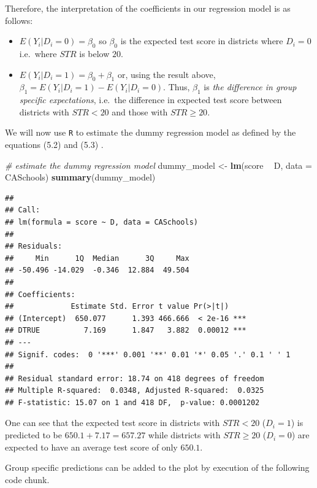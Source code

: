 \documentclass[]{book}
\newenvironment{Shaded}{\begin{snugshade}}{\end{snugshade}}
\newcommand{\KeywordTok}[1]{\textcolor[rgb]{0.13,0.29,0.53}{\textbf{#1}}}
\newcommand{\DataTypeTok}[1]{\textcolor[rgb]{0.13,0.29,0.53}{#1}}
\newcommand{\StringTok}[1]{\textcolor[rgb]{0.31,0.60,0.02}{#1}}
\newcommand{\CommentTok}[1]{\textcolor[rgb]{0.56,0.35,0.01}{\textit{#1}}}
\newcommand{\OperatorTok}[1]{\textcolor[rgb]{0.81,0.36,0.00}{\textbf{#1}}}
\newcommand{\NormalTok}[1]{#1}
\theoremstyle{definition}
\theoremstyle{definition}
\theoremstyle{definition}
\theoremstyle{remark}
\begin{document}
Therefore, the interpretation of the coefficients in our regression
model is as follows:

\begin{itemize}
\item
  \(E(Y_i | D_i = 0) = \beta_0\) so \(\beta_0\) is the expected test
  score in districts where \(D_i=0\) i.e.~where \(STR\) is below \(20\).
\item
  \(E(Y_i | D_i = 1) = \beta_0 + \beta_1\) or, using the result above,
  \(\beta_1 = E(Y_i | D_i = 1) - E(Y_i | D_i = 0)\). Thus, \(\beta_1\)
  is \emph{the difference in group specific expectations}, i.e.~the
  difference in expected test score between districts with \(STR < 20\)
  and those with \(STR \geq 20\).
\end{itemize}

We will now use \texttt{R} to estimate the dummy regression model as
defined by the equations (5.2) and (5.3) .

\begin{Shaded}
\begin{Highlighting}[]
\CommentTok{# estimate the dummy regression model}
\NormalTok{dummy_model <-}\StringTok{ }\KeywordTok{lm}\NormalTok{(score }\OperatorTok{~}\StringTok{ }\NormalTok{D, }\DataTypeTok{data =}\NormalTok{ CASchools)}
\KeywordTok{summary}\NormalTok{(dummy_model)}
\end{Highlighting}
\end{Shaded}

\begin{verbatim}
## 
## Call:
## lm(formula = score ~ D, data = CASchools)
## 
## Residuals:
##     Min      1Q  Median      3Q     Max 
## -50.496 -14.029  -0.346  12.884  49.504 
## 
## Coefficients:
##             Estimate Std. Error t value Pr(>|t|)    
## (Intercept)  650.077      1.393 466.666  < 2e-16 ***
## DTRUE          7.169      1.847   3.882  0.00012 ***
## ---
## Signif. codes:  0 '***' 0.001 '**' 0.01 '*' 0.05 '.' 0.1 ' ' 1
## 
## Residual standard error: 18.74 on 418 degrees of freedom
## Multiple R-squared:  0.0348, Adjusted R-squared:  0.0325 
## F-statistic: 15.07 on 1 and 418 DF,  p-value: 0.0001202
\end{verbatim}

One can see that the expected test score in districts with \(STR < 20\)
(\(D_i = 1\)) is predicted to be \(650.1 + 7.17 = 657.27\) while
districts with \(STR \geq 20\) (\(D_i = 0\)) are expected to have an
average test score of only \(650.1\).

Group specific predictions can be added to the plot by execution of the
following code chunk.
\end{document}
